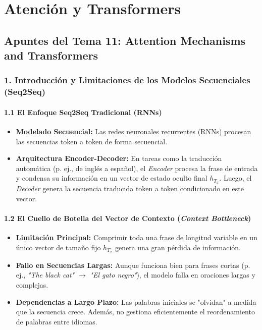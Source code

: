 \chapter{Atención y Transformers}
\section{Apuntes del Tema 11: Attention Mechanisms and Transformers}

\subsection{1. Introducción y Limitaciones de los Modelos Secuenciales (Seq2Seq)}

\subsubsection{1.1 El Enfoque Seq2Seq Tradicional (RNNs)}

\begin{itemize}
	\item \textbf{Modelado Secuencial:} Las redes neuronales recurrentes (RNNs) procesan las secuencias token a token de forma secuencial.
	
	\item \textbf{Arquitectura Encoder-Decoder:} En tareas como la traducción automática (p. ej., de inglés a español), el \emph{Encoder} procesa la frase de entrada y condensa su información en un vector de estado oculto final $h_{T_x}$. Luego, el \emph{Decoder} genera la secuencia traducida token a token condicionado en este vector.
\end{itemize}

\subsubsection{1.2 El Cuello de Botella del Vector de Contexto (\emph{Context Bottleneck})}

\begin{itemize}
	\item \textbf{Limitación Principal:} Comprimir toda una frase de longitud variable en un único vector de tamaño fijo $h_{T_x}$ genera una gran pérdida de información.
	\item \textbf{Fallo en Secuencias Largas:} Aunque funciona bien para frases cortas (p. ej., \emph{"The black cat"} $\rightarrow$ \emph{"El gato negro"}), el modelo falla en oraciones largas y complejas.
	\item \textbf{Dependencias a Largo Plazo:} Las palabras iniciales se "olvidan" a medida que la secuencia crece. Además, no gestiona eficientemente el reordenamiento de palabras entre idiomas.
\end{itemize}

